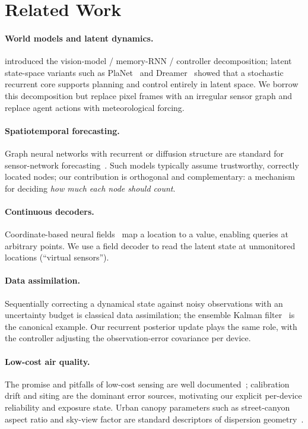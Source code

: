 \documentclass[10pt]{article}
\begin{document}
\section{Related Work}
\paragraph{World models and latent dynamics.}
\citet{ha2018world} introduced the vision-model / memory-RNN / controller
decomposition; latent state-space variants such as
PlaNet~\citep{hafner2019planet} and Dreamer~\citep{hafner2020dream} showed that a
stochastic recurrent core supports planning and control entirely in latent space.
We borrow this decomposition but replace pixel frames with an irregular sensor
graph and replace agent actions with meteorological forcing.

\paragraph{Spatiotemporal forecasting.}
Graph neural networks with recurrent or diffusion structure are standard for
sensor-network forecasting~\citep{kipf2017gcn,li2018dcrnn}. Such models typically
assume trustworthy, correctly located nodes; our contribution is orthogonal and
complementary: a mechanism for deciding \emph{how much each node should count}.

\paragraph{Continuous decoders.}
Coordinate-based neural fields~\citep{mildenhall2020nerf,sitzmann2020siren} map a
location to a value, enabling queries at arbitrary points. We use a
field decoder to read the latent state at unmonitored locations (``virtual
sensors'').

\paragraph{Data assimilation.}
Sequentially correcting a dynamical state against noisy observations with an
uncertainty budget is classical data assimilation; the ensemble Kalman
filter~\citep{evensen2003enkf} is the canonical example. Our recurrent posterior
update plays the same role, with the controller adjusting the observation-error
covariance per device.

\paragraph{Low-cost air quality.}
The promise and pitfalls of low-cost sensing are well
documented~\citep{lewis2016validate,zheng2013uair}; calibration drift and siting
are the dominant error sources, motivating our explicit per-device reliability and
exposure state. Urban canopy parameters such as street-canyon aspect ratio and
sky-view factor are standard descriptors of dispersion
geometry~\citep{oke1988street}.
\end{document}
